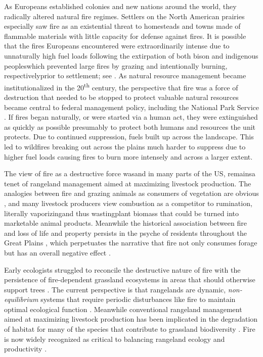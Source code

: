 As Europeans established colonies and new nations around the world, they radically altered natural fire regimes. 
Settlers on the North American prairies especially saw fire as an existential threat to homesteads and towns made of flammable materials with little capacity for defense against fires. 
It is possible that the fires Europeans encountered were extraordinarily intense due to unnaturally high fuel loads following the extirpation of both bison and indigenous peoples\textemdash which prevented large fires by grazing and intentionally burning, respectively\textemdash prior to settlement; see \citet{courtwright2011}. 
As natural resource management became institutionalized in the 20\textsuperscript{th} century, the perspective that fire was a force of destruction that needed to be stopped to protect valuable natural resources became central to federal management policy, including the National Park Service \citep{umbanhowarjr1996, bachelet2000}. 
If fires began naturally, or were started via a human act, they were extinguished as quickly as possible presumably to protect both humans and resources the unit protects. 
Due to continued suppression, fuels built up across the landscape. 
This led to wildfires breaking out across the plains much harder to suppress due to higher fuel loads causing fires to burn more intensely and across a larger extent.

The view of fire as a destructive force was\textemdash and in many parts of the US, remains\textemdash a tenet of rangeland management aimed at maximizing livestock production. 
The analogies between fire and grazing animals as consumers of vegetation are obvious \citep{bond2005}, and many livestock producers view combustion as a competitor to rumination, literally vaporizing\textemdash and thus wasting\textemdash plant biomass that could be turned into marketable animal products. 
Meanwhile the historical association between fire and loss of life and property persists in the psyche of residents throughout the Great Plains \citep{courtwright2007}, which perpetuates the narrative that fire not only consumes forage but has an overall negative effect \citep[e.g.,][]{wright1982}. 

Early ecologists struggled to reconcile the destructive nature of fire with the persistence of fire-dependent grassland ecosystems in areas that should otherwise support trees \citep{clements1916,transeau1935}. 
The current perspective is that rangelands are dynamic, \emph{non-equilibrium} systems that require periodic disturbances like fire to maintain optimal ecological function \citep{westoby1989}. 
Meanwhile conventional rangeland management aimed at maximizing livestock production has been implicated in the degradation of habitat for many of the species that contribute to grassland biodiversity \citep{fuhlendorf2001}. 
Fire is now widely recognized as critical to balancing rangeland ecology and productivity \citep{toombs2010, fuhlendorf2012}.


